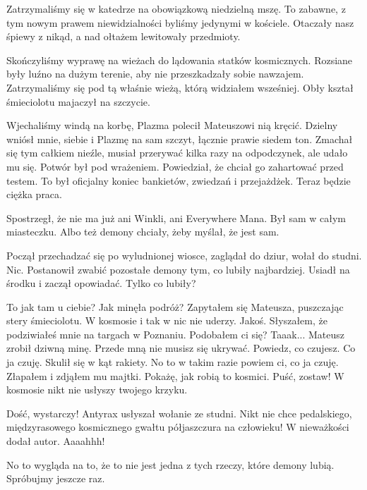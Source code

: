 Zatrzymaliśmy się w katedrze na obowiązkową niedzielną mszę.
To zabawne, z tym nowym prawem niewidzialności byliśmy jedynymi w kościele. 
Otaczały nasz śpiewy z nikąd, a nad ołtażem lewitowały przedmioty.

Skończyliśmy wyprawę na wieżach do lądowania statków kosmicznych.
Rozsiane były luźno na dużym terenie, aby nie przeszkadzały sobie nawzajem.
Zatrzymaliśmy się pod tą właśnie wieżą, którą widziałem wsześniej. 
Obły kształ śmieciolotu majaczył na szczycie.

Wjechaliśmy windą na korbę, Plazma polecił Mateuszowi nią kręcić.
Dzielny wniósł mnie, siebie i Plazmę na sam szczyt, łącznie prawie siedem ton. 
Zmachał się tym całkiem nieźle, musiał przerywać kilka razy na odpodczynek, ale udało mu się.
Potwór był pod wrażeniem. Powiedział, że chciał go zahartować przed testem. 
To był oficjalny koniec bankietów, zwiedzań i przejażdżek. Teraz będzie ciężka praca.

\divider{}

Spostrzegł, że nie ma już ani Winkli, ani Everywhere Mana. 
Był sam w całym miasteczku.
Albo też demony chciały, żeby myślał, że jest sam.

Począł przechadzać się po wyludnionej wiosce, zaglądał do dziur, wołał do studni. Nic.
Postanowił zwabić pozostałe demony tym, co lubiły najbardziej.
Usiadł na środku i zaczął opowiadać. Tylko co lubiły?

\divider{}

\begin{dialogue}
\ds{} To jak tam u ciebie? Jak minęła podróż? \dm{} Zapytałem się Mateusza, puszczając stery śmieciolotu. W kosmosie i tak w nic nie uderzy.
\ds{} Jakoś.
\ds{} Słyszałem, że podziwiałeś mnie na targach w Poznaniu. Podobałem ci się?
\ds{} Taaak... \dm{} Mateusz zrobił dziwną minę.
\ds{} Przede mną nie musisz się ukrywać. Powiedz, co czujesz.
\ds{} Co ja czuję. \dm{} Skulił się w kąt rakiety.
\ds{} No to w takim razie powiem ci, co ja czuję. \dm{} Złapałem i zdjąłem mu majtki. \dm{} Pokażę, jak robią to kosmici.
\ds{} Puść, zostaw!
\ds{} W kosmosie nikt nie usłyszy twojego krzyku.
\end{dialogue}

\divider{}

\begin{dialogue}
\ds{} Dość, wystarczy! \dm{} Antyrax usłyszał wołanie ze studni. \dm{} Nikt nie chce pedalskiego, międzyrasowego kosmicznego gwałtu półjaszczura na człowieku!
\ds{} W nieważkości \dm{} dodał autor.
\ds{} Aaaahhh!
\end{dialogue}
No to wygląda na to, że to nie jest jedna z tych rzeczy, które demony lubią.
Spróbujmy jeszcze raz.

